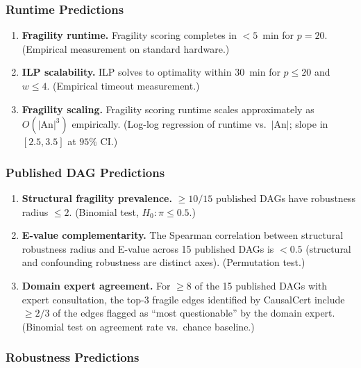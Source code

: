 \documentclass[11pt,a4paper]{article}
\theoremstyle{definition}
\theoremstyle{remark}
\newcommand{\An}{\mathrm{An}}
\begin{document}
\subsubsection{Runtime Predictions}

\begin{enumerate}[label=\textbf{P\arabic*:},resume]
\item \textbf{Fragility runtime.} Fragility scoring completes in $< 5$~min for $p = 20$.
  (Empirical measurement on standard hardware.)

\item \textbf{ILP scalability.} ILP solves to optimality within 30~min for $p \leq 20$
  and $w \leq 4$. (Empirical timeout measurement.)

\item \textbf{Fragility scaling.} Fragility scoring runtime scales approximately as
  $O(|\An|^3)$ empirically. (Log-log regression of runtime vs.\ $|\An|$; slope in
  $[2.5, 3.5]$ at $95\%$ CI.)
\end{enumerate}

\subsubsection{Published DAG Predictions}

\begin{enumerate}[label=\textbf{P\arabic*:},resume]
\item \textbf{Structural fragility prevalence.} $\geq 10/15$ published DAGs have
  robustness radius $\leq 2$. (Binomial test, $H_0: \pi \leq 0.5$.)

\item \textbf{E-value complementarity.} The Spearman correlation between structural
  robustness radius and E-value across 15 published DAGs is $< 0.5$ (structural and
  confounding robustness are distinct axes). (Permutation test.)

\item \textbf{Domain expert agreement.} For $\geq 8$ of the 15 published DAGs with
  expert consultation, the top-3 fragile edges identified by CausalCert include
  $\geq 2/3$ of the edges flagged as ``most questionable'' by the domain expert.
  (Binomial test on agreement rate vs.\ chance baseline.)
\end{enumerate}

\subsubsection{Robustness Predictions}
\end{document}
